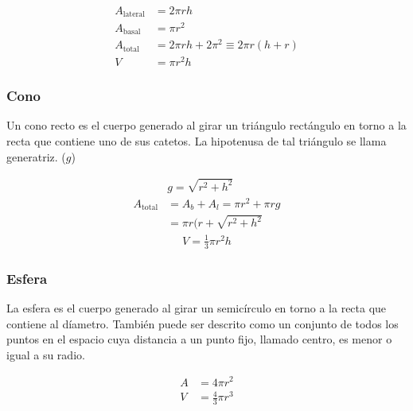 \begin{equation*}
    \begin{split} 
    A_{\text{lateral}} &= 2\pi rh\\
    A_{\text{basal}} &= \pi r^2\\
    A_{\text{total}} &= 2\pi rh + 2\pi ^2 \equiv 2\pi r(h+r)\\
    V &= \pi r^2h
    \end{split}
\end{equation*}
\subsubsection{Cono}
Un cono recto es el cuerpo generado al girar un triángulo rectángulo en torno a la recta que contiene uno de sus catetos. La hipotenusa de tal triángulo se llama generatriz. ($g$)

\begin{equation*}
    \begin{split} 
        &g = \sqrt{r^2 + h^2}\\
        A_{\text{total}} &= A_b + A_l = \pi r^2 + \pi rg \\
        &= \pi r(r + \sqrt{r^2 + h^2}
    \end{split}
\end{equation*}
\begin{equation*}
    \begin{aligned} 
        V = \frac{1}{3}\pi r^2h
    \end{aligned}
\end{equation*}
\subsubsection{Esfera}
La esfera es el cuerpo generado al girar un semicírculo en torno a la recta que contiene al díametro. También puede ser descrito como un conjunto de todos los puntos en el espacio cuya distancia a un punto fijo, llamado centro, es menor o igual a su radio.

\begin{equation*}
    \begin{split} 
        A &= 4\pi r^2\\
        V &= \frac{4}{3} \pi r^3
    \end{split}
\end{equation*}